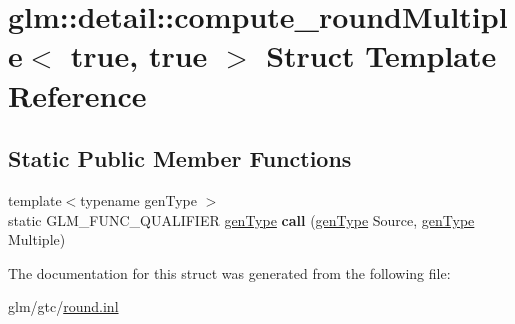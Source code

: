 \hypertarget{structglm_1_1detail_1_1compute__roundMultiple_3_01true_00_01true_01_4}{\section{glm\-:\-:detail\-:\-:compute\-\_\-round\-Multiple$<$ true, true $>$ Struct Template Reference}
\label{structglm_1_1detail_1_1compute__roundMultiple_3_01true_00_01true_01_4}
}
\subsection*{Static Public Member Functions}
\begin{DoxyCompactItemize}
\item 
\hypertarget{structglm_1_1detail_1_1compute__roundMultiple_3_01true_00_01true_01_4_ad2ba30e3338e768e6119c957f44b2216}{{\footnotesize template$<$typename gen\-Type $>$ }\\static G\-L\-M\-\_\-\-F\-U\-N\-C\-\_\-\-Q\-U\-A\-L\-I\-F\-I\-E\-R \hyperlink{structglm_1_1detail_1_1genType}{gen\-Type} {\bfseries call} (\hyperlink{structglm_1_1detail_1_1genType}{gen\-Type} Source, \hyperlink{structglm_1_1detail_1_1genType}{gen\-Type} Multiple)}\label{structglm_1_1detail_1_1compute__roundMultiple_3_01true_00_01true_01_4_ad2ba30e3338e768e6119c957f44b2216}

\end{DoxyCompactItemize}


The documentation for this struct was generated from the following file\-:\begin{DoxyCompactItemize}
\item 
glm/gtc/\hyperlink{round_8inl}{round.\-inl}\end{DoxyCompactItemize}
